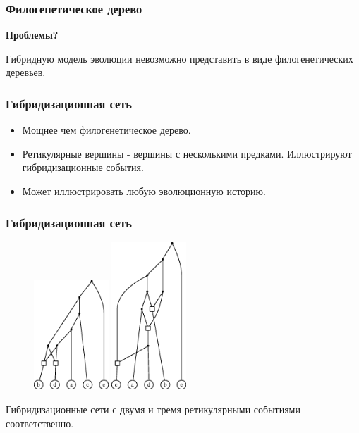\documentclass[hyperref={unicode}]{beamer}
\begin{document}
\begin{frame}
\frametitle{Филогенетическое дерево}

\textbf{Проблемы?}

Гибридную модель эволюции невозможно представить в виде филогенетических деревьев.

\end{frame}

\begin{frame}
\frametitle{Гибридизационная сеть}

\begin{itemize}
	\item Мощнее чем филогенетическое дерево.
	\item Ретикулярные вершины - вершины с несколькими предками. Иллюстрируют гибридизационные события.
	\item Может иллюстрировать любую эволюционную историю.
\end{itemize}

\end{frame}

\begin{frame}
\frametitle{Гибридизационная сеть}

\centering

\begin{figure}[t]
	\includegraphics[width=2.8cm]{img/ans.eps}
	\hspace{1cm}
	\includegraphics[width=2.8cm]{img/ans3.eps}
\end{figure}

Гибридизационные сети с двумя и тремя ретикулярными событиями соответственно.

\end{frame} 
\end{document}
